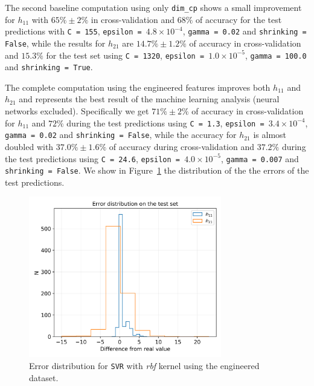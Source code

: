     The second baseline computation using only \texttt{dim\_cp} shows a small improvement for $h_{11}$ with $65\% \pm 2\%$ in cross-validation and $68\%$ of accuracy for the test predictions with \texttt{C = 155}, \texttt{epsilon = $4.8 \times 10^{-4}$}, \texttt{gamma = 0.02} and \texttt{shrinking = False}, while the results for $h_{21}$ are $14.7\% \pm 1.2\%$ of accuracy in cross-validation and $15.3\%$ for the test set using \texttt{C = 1320}, \texttt{epsilon = $1.0 \times 10^{-5}$}, \texttt{gamma = 100.0} and \texttt{shrinking = True}.
    
    The complete computation using the engineered features improves both $h_{11}$ and $h_{21}$ and represents the best result of the machine learning analysis (neural networks excluded). Specifically we get $71\% \pm 2\%$ of accuracy in cross-validation for $h_{11}$ and $72\%$ during the test predictions using \texttt{C = 1.3}, \texttt{epsilon = $3.4 \times 10^{-4}$}, \texttt{gamma = 0.02} and \texttt{shrinking = False}, while the accuracy for $h_{21}$ is almost doubled with $37.0\% \pm 1.6\%$ of accuracy during cross-validation and $37.2\%$ during the test predictions using \texttt{C = 24.6}, \texttt{epsilon = $4.0 \times 10^{-5}$}, \texttt{gamma = 0.007} and \texttt{shrinking = False}. We show in Figure~\ref{fig:svr_rbf_err} the distribution of the the errors of the test predictions.
    
    \begin{figure}[t]
        \centering
        \includegraphics[width=0.75\textwidth]{tex/img/svr_rbf_error_eng.png}
        \caption{Error distribution for \texttt{SVR} with \textit{rbf} kernel using the engineered dataset.}
        \label{fig:svr_rbf_err}
    \end{figure}